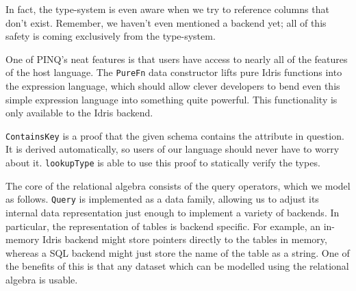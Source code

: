 \documentclass[12pt]{report}
\begin{document}
In fact, the type-system is even aware when we try to reference columns that don't exist.
Remember, we haven't even mentioned a backend yet; all of this safety is coming exclusively from the type-system.

One of PINQ's neat features is that users have access to nearly all of the features of the host language.
The \texttt{PureFn} data constructor lifts pure Idris functions into the expression language, which should allow clever developers to bend even this simple expression language into something quite powerful.
This functionality is only available to the Idris backend.

\texttt{ContainsKey} is a proof that the given schema contains the attribute in question.
It is derived automatically, so users of our language should never have to worry about it.
\texttt{lookupType} is able to use this proof to statically verify the types.

The core of the relational algebra consists of the query operators, which we model as follows.
\texttt{Query} is implemented as a data family, allowing us to adjust its internal data representation just enough to implement a variety of backends.
In particular, the representation of tables is backend specific.
For example, an in-memory Idris backend might store pointers directly to the tables in memory, whereas a SQL backend might just store the name of the table as a string.
One of the benefits of this is that any dataset which can be modelled using the relational algebra is usable.
\end{document}
